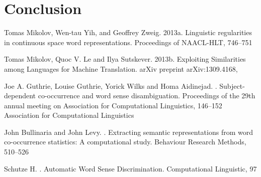 \documentclass[11pt]{article}
\begin{document}
\section{Conclusion}
\begin{thebibliography}{}

Tomas Mikolov, Wen-tau Yih, and Geoffrey Zweig.
\newblock 2013a.
\newblock Linguistic regularities in continuous space word representations.
\newblock Proceedings of NAACL-HLT, 
746--751

Tomas Mikolov, Quoc V. Le and Ilya Sutskever.
\newblock 2013b.
\newblock Exploiting Similarities among Languages for Machine Translation.
\newblock arXiv preprint arXiv:1309.4168, 

Joe A. Guthrie, Louise Guthrie, Yorick Wilks and Homa Aidinejad.
.
\newblock Subject-dependent co-occurrence and word sense disambiguation.
\newblock Proceedings of the 29th annual meeting on Association for Computational Linguistics, 
146--152
\newblock
Association for Computational Linguistics

John Bullinaria and John Levy.
.
\newblock Extracting semantic representations from word co-occurrence statistics: A computational study.
\newblock Behaviour Research Methods, 
510--526

Schutze H.
.
\newblock Automatic Word Sense Discrimination.
\newblock Computational Linguistic, 
97
\end{thebibliography}
\end{document}
